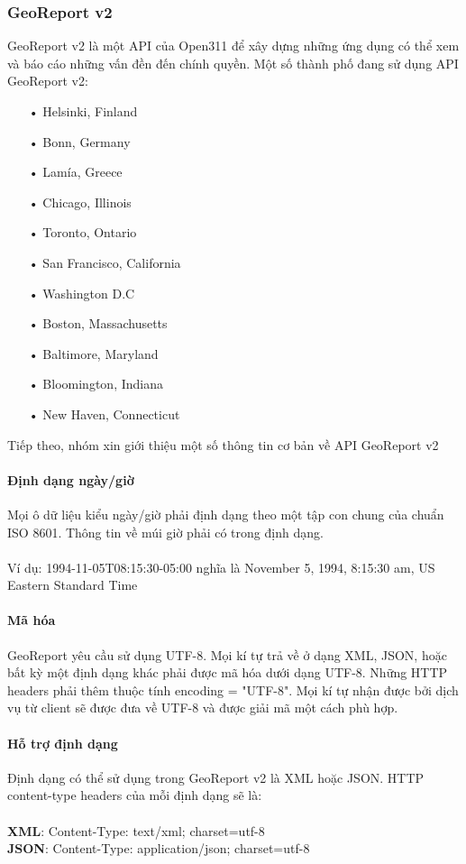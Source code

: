 \documentclass[a4paper]{article}
\begin{document}
\subsubsection{GeoReport v2}
GeoReport v2 là một API của Open311 để xây dựng những ứng dụng có thể xem và báo cáo những vấn đền đến chính quyền.
Một số thành phố đang sử dụng API GeoReport v2:
\begin{itemize}
    \item[•]Helsinki, Finland
	\item[•]Bonn, Germany
	\item[•]Lamía, Greece
	\item[•]Chicago, Illinois
	\item[•]Toronto, Ontario
	\item[•]San Francisco, California
	\item[•]Washington D.C
	\item[•]Boston, Massachusetts
	\item[•]Baltimore, Maryland
	\item[•]Bloomington, Indiana
	\item[•]New Haven, Connecticut
\end{itemize}
Tiếp theo, nhóm xin giới thiệu một số thông tin cơ bản về API GeoReport v2
\paragraph*{Định dạng ngày/giờ}
Mọi ô dữ liệu kiểu ngày/giờ phải định dạng theo một tập con chung của chuẩn ISO 8601. Thông tin về múi giờ phải có trong định dạng.\\
\\
Ví dụ: 1994-11-05T08:15:30-05:00 nghĩa là  November 5, 1994, 8:15:30 am, US Eastern Standard Time

\paragraph*{Mã hóa}
GeoReport yêu cầu sử dụng UTF-8. Mọi kí tự trả về ở dạng XML, JSON, hoặc bất kỳ một định dạng khác phải được mã hóa dưới dạng UTF-8. Những HTTP headers phải thêm thuộc tính encoding = "UTF-8". Mọi kí tự nhận được bởi dịch vụ từ client sẽ được đưa về UTF-8 và được giải mã một cách phù hợp. 
\paragraph*{Hỗ trợ định dạng}
Định dạng có thể sử dụng trong GeoReport v2 là XML hoặc JSON.
HTTP content-type headers của mỗi định dạng sẽ là: \\
\\
\textbf{XML}: Content-Type: text/xml; charset=utf-8\\
\textbf{JSON}: Content-Type: application/json; charset=utf-8
\end{document}
